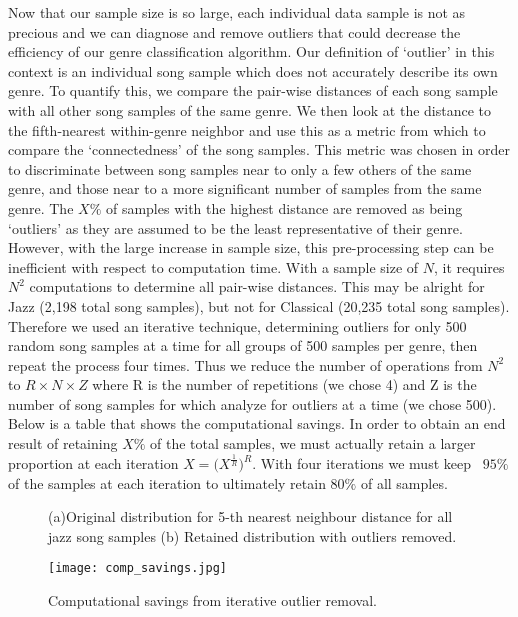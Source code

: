 \documentclass[10pt]{article}
\begin{document}
Now that our sample size is so large, each individual data sample is not as precious and we can diagnose and remove outliers that could decrease the efficiency of our genre classification algorithm.  Our definition of ‘outlier’ in this context is an individual song sample which does not accurately describe its own genre.  To quantify this, we compare the pair-wise distances of each song sample with all other song samples of the same genre.  We then look at the distance to the fifth-nearest within-genre neighbor and use this as a metric from which to compare the ‘connectedness’ of the song samples.  This metric was chosen in order to discriminate between song samples near to only a few others of the same genre, and those near to a more significant number of samples from the same genre.  The $X\%$ of samples with the highest distance are removed as being ‘outliers’ as they are assumed to be the least representative of their genre.
However, with the large increase in sample size, this pre-processing step can be inefficient with respect to computation time.  With a sample size of $N$, it requires $N^2$ computations to determine all pair-wise distances.  This may be alright for Jazz (2,198 total song samples), but not for Classical (20,235 total song samples).  Therefore we used an iterative technique, determining outliers for only 500 random song samples at a time for all groups of 500 samples per genre, then repeat the process four times.  Thus we reduce the number of operations from $N^2$ to $R \times N \times Z$ where R is the number of repetitions (we chose 4) and Z is the number of song samples for which analyze for outliers at a time (we chose 500).  Below is a table that shows the computational savings.  In order to obtain an end result of retaining $X\%$ of the total samples, we must actually retain a larger proportion at each iteration $X = \big(X^{\frac{1}{R}} \big)^R $.  With four iterations we must keep ~$95\%$ of the samples at each iteration to ultimately retain $80\%$ of all samples.  



\begin{figure}[h!]
\caption{(a)Original distribution for 5-th nearest neighbour  distance for all jazz song samples  (b) Retained distribution with outliers removed.}
\label{fig:jazz_outlier_removal}
\end{figure}

\begin{figure}[h!]
\centering
\texttt{[image: comp\_savings.jpg]}
\caption{Computational savings from iterative outlier removal.}
\label{fig:compSavings}
\end{figure}
\end{document}
